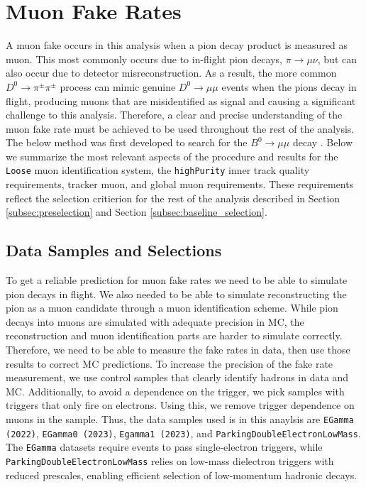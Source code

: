\section{Muon Fake Rates}
\label{sec:muon_fake_rate}

A muon fake occurs in this analysis when a pion decay product is measured as muon. This most commonly occurs due to in-flight pion decays, $\pi \to \mu \nu$, but can also occur due to detector misreconstruction. As a result, the more common $D^0 \to \pi^\pm \pi^\pm$ process can mimic genuine $D^0 \to \mu \mu$ events when the pions decay in flight, producing muons that are misidentified as signal and causing a significant challenge to this analysis. Therefore, a clear and precise understanding of the muon fake rate must be achieved to be used throughout the rest of the analysis. The below method was first developed to search for the $B^0 \to \mu \mu$ decay \cite{ref:2023b0mumu}. Below we summarize the most relevant aspects of the procedure and results for the \texttt{Loose} muon identification system, the \texttt{highPurity} inner track quality requirements, tracker muon, and global muon requirements. These requirements reflect the selection critierion for the rest of the analysis described in Section \ref{subsec:preselection} and Section \ref{subsec:baseline_selection}.

\subsection{Data Samples and Selections}

To get a reliable prediction for muon fake rates we need to be able to simulate pion decays in flight. We also needed to be able to simulate reconstructing the pion as a muon candidate through a muon identification scheme. While pion decays into muons are simulated with adequate precision in MC, the reconstruction and muon identification parts are harder to simulate correctly. Therefore, we need to be able to measure the fake rates in data, then use those results to correct MC predictions. To increase the precision of the fake rate measurement, we use control samples that clearly identify hadrons in data and MC. Additionally, to avoid a dependence on the trigger, we pick samples with triggers that only fire on  electrons. Using this, we remove trigger dependence on muons in the sample. Thus, the data samples used is in this anaylsis are \texttt{EGamma (2022)}, \texttt{EGamma0 (2023)}, \texttt{Egamma1 (2023)}, and \texttt{ParkingDoubleElectronLowMass}. The \texttt{EGamma} datasets require events to pass single-electron triggers, while \texttt{ParkingDoubleElectronLowMass} relies on low-mass dielectron triggers with reduced prescales, enabling efficient selection of low-momentum hadronic decays.

